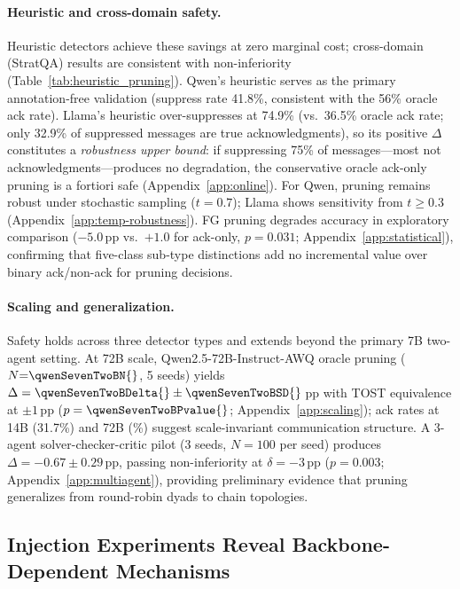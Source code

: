 \paragraph{Heuristic and cross-domain safety.} Heuristic detectors achieve these savings at zero marginal cost; cross-domain (StratQA) results are consistent with non-inferiority (Table~\ref{tab:heuristic_pruning}). Qwen's heuristic serves as the primary annotation-free validation (suppress rate 41.8\%, consistent with the 56\% oracle ack rate). Llama's heuristic over-suppresses at 74.9\% (vs.\ 36.5\% oracle ack rate; only 32.9\% of suppressed messages are true acknowledgments), so its positive $\Delta$ constitutes a \emph{robustness upper bound}: if suppressing 75\% of messages---most not acknowledgments---produces no degradation, the conservative oracle ack-only pruning is a fortiori safe (Appendix~\ref{app:online}). For Qwen, pruning remains robust under stochastic sampling ($t{=}0.7$); Llama shows sensitivity from $t{\geq}0.3$ (Appendix~\ref{app:temp-robustness}). FG pruning degrades accuracy in exploratory comparison ($-5.0$\,pp vs.\ $+1.0$ for ack-only, $p = 0.031$; Appendix~\ref{app:statistical}), confirming that five-class sub-type distinctions add no incremental value over binary ack/non-ack for pruning decisions.

\paragraph{Scaling and generalization.} Safety holds across three detector types and extends beyond the primary 7B two-agent setting. At 72B scale, Qwen2.5-72B-Instruct-AWQ oracle pruning ($N{=}\qwenSevenTwoBN{}$, 5 seeds) yields $\Delta = \qwenSevenTwoBDelta{} \pm \qwenSevenTwoBSD{}$\,pp with TOST equivalence at $\pm 1$\,pp ($p = \qwenSevenTwoBPvalue{}$; Appendix~\ref{app:scaling}); ack rates at 14B (31.7\%) and 72B (\qwenSevenTwoBSupp{}\%) suggest scale-invariant communication structure. A 3-agent solver-checker-critic pilot (3 seeds, $N{=}100$ per seed) produces $\Delta = -0.67 \pm 0.29$\,pp, passing non-inferiority at $\delta = -3$\,pp ($p = 0.003$; Appendix~\ref{app:multiagent}), providing preliminary evidence that pruning generalizes from round-robin dyads to chain topologies.

\subsection{Injection Experiments Reveal Backbone-Dependent Mechanisms}
\label{sec:causal_injection}

